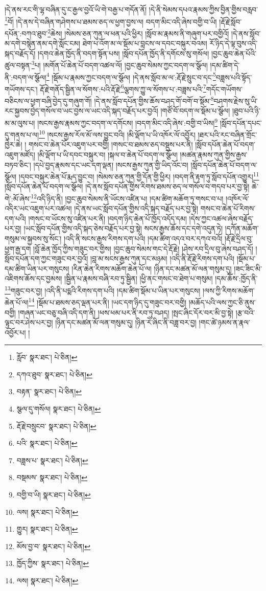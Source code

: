 །དེ་ནས་རང་གི་ལྷ་བཞིན་དུ་ང་རྒྱལ་བྱའོ་ཡི་གེ་བརྒྱ་པ་གདོན་ནོ། །དེ་ནི་སེམས་དཔའ་རྣམས་ཀྱིས་བྱིན་གྱིས་བརླབ་\footnote{རློབ་  སྣར་ཐང་།  པེ་ཅིན། }བོ། །དེ་ནས་དེ་བཞིན་གཤེགས་པ་ཐམས་ཅད་ལ་ཕྱག་བྱས་ལ། བདག་མིང་འདི་ཞེས་བགྱི་བ་ཡི། །རྡོ་རྗེ་སློབ་དཔོན་:བཀའ་ཐུབ་\footnote{དཀའ་ཐུབ་  སྣར་ཐང་།  པེ་ཅིན། }ཆེས། །སེམས་ཅན་ཀུན་ལ་ཕན་པའི་ཕྱིར། །སློབ་མ་རྣམས་ནི་གཞུག་པར་བགྱིའོ། །དེ་ནས་སློབ་མ་དགེ་བསྙེན་ནམ་དགེ་སློང་ངམ། ཐེག་པ་འོག་མ་ལ་སྡོམ་པ་བླངས་ལ་དབང་བསྐུར་བའམ། རོ་ཉིད་དེ་ལྟ་བུས་འདི་སྐད་བརྗོད་དོ། །དགའ་ཆེན་ཁྱོད་ནི་བདག་སྟོན་པས། །སློབ་དཔོན་ཁྱོད་ནི་དགོངས་སུ་གསོལ། །བྱང་ཆུབ་ཆེན་པོའི་ཚུལ་བསྟན་\footnote{བརྟན་  སྣར་ཐང་།  པེ་ཅིན། }པ། །མགོན་པོ་ཆེན་པོ་བདག་འཚལ་ལོ། །བྱང་ཆུབ་སེམས་ཀྱང་བདག་ལ་སྩོལ། །དམ་ཚིག་དེ་ནི་:བདག་ལ་སྩོལ།\footnote{སྩལ་དུ་གསོལ།  སྣར་ཐང་།  པེ་ཅིན། } །སྡོམ་པ་རྣམས་ཀྱང་བདག་ལ་སྩོལ། །དེ་ནས་སློབ་མ་ལ་:རྡོ་རྗེ་སྲུང་བ་དང་\footnote{རྡོ་རྗེ་བསྲུངབ་  སྣར་ཐང་།  པེ་ཅིན། }བཟླས་པའི་སྟོད་གཡོགས་དང་། རྡོ་རྗེ་གནོད་སྦྱིན་ལ་སོགས་:པའི་རྡོ་རྗེ་\footnote{པའི་  སྣར་ཐང་།  པེ་ཅིན། }ལྕགས་ཀྱུ་ལ་སོགས་པ་:བཟླས་པའི་\footnote{བཟླས་པ་  སྣར་ཐང་།  པེ་ཅིན། }གདོང་གཡོགས་བཅིངས་ལ་ཕྱག་བཞི་བྱེད་དུ་གཞུག་གོ། །དེ་ནས་སློབ་དཔོན་གྱིས་ཆོས་བཤད་གོ་བགོ་བ་སྡོམ་\footnote{བསྡམས་  སྣར་ཐང་།  པེ་ཅིན། }བཤགས་རྗེས་སུ་ཡི་རང་སྐྱབས་བྱེད་གསོལ་བ་ཡང་བྱས་ལ་ཡང་འདི་སྐད་བརྗོད་པར་བྱའོ། །གཙོ་བོ་བདག་ལ་སྡོམ་པ་སྩོལ། །ཐུབ་པའི་ཉི་མ་མ་ལུས་པ། །སངས་རྒྱས་རྣམས་ཀྱང་བདག་ལ་དགོངས། །བདག་མིང་འདི་ཞེས་:བགྱི་བ་ཡིས།\footnote{བགྱི་བ་ཡི།  སྣར་ཐང་།  པེ་ཅིན། } །སློབ་དཔོན་དཔང་དུ་གནས་པ་ལ།\footnote{ལས།  སྣར་ཐང་།  པེ་ཅིན། } །སངས་རྒྱས་རོལ་མོ་ལས་བྱུང་བའི། །མི་ལྡོག་པ་ཡི་འཁོར་ལོ་འབྱོར། །ཐར་པའི་རང་བཞིན་གྲོང་ཁྱེར་ཆེ། །
གསང་བ་ཆེན་པོར་འཇུག་པར་བགྱི། །གསང་བ་ཐམས་ཅད་བསྡུས་པར་ནི། །སློབ་དཔོན་ཆེན་པོ་བདག་འཇུག་མཛོད། །མི་ལྡོག་པ་ཡི་དབང་བསྐུར་བ། །སྐལ་བ་ཆེན་པོ་བདག་ལ་སྩོལ། །མཚན་རྣམས་ཀུན་གྱིས་རྒྱས་བཏབ་ཅིང་། །དཔེ་བྱད་རྣམས་དང་ཡང་དག་ལྡན། །སངས་རྒྱས་ཀུན་གྱི་ཡིད་འོང་བ། །སློབ་དཔོན་ཆེན་པོ་བདག་ལ་སྩོལ། །དབང་བསྐུར་ཆེན་པོ་རྨད་བྱུང་བ། །སེམས་ཅན་ཀུན་གྱི་དོན་གྱི་ཕྱིར། །བདག་ནི་རྟག་ཏུ་སློབ་དཔོན་འགྱུར།\footnote{གྱུར།  སྣར་ཐང་།  པེ་ཅིན། } །སློབ་དཔོན་ཆེན་པོ་བདག་ལ་སྩོལ། །དེ་ནས་སློབ་དཔོན་གྱིས་རིགས་ཐམས་ཅད་ལ་གསོལ་བ་གདབ་པར་བྱ་སྟེ། ཆེ་གེ་:མོ་ཞེས་\footnote{མོས་བྱ་བ་  སྣར་ཐང་།  པེ་ཅིན། }འདི་ཉིད་ནི། །བྱང་ཆུབ་སེམས་ནི་ཡོངས་འཛིན་པ། །དམ་ཚིག་མཆོག་ཏུ་གསང་བ་པ། །འཁོར་ལོ་འདིར་ཡང་འཇུག་པར་འཚལ། །དེ་ནས་ཡང་སློབ་དཔོན་གྱིས་འདི་སྐད་བརྗོད་པར་བྱ་སྟེ། གསང་བ་ཆེན་པོ་རིགས་དག་པའི། །གསང་བ་ཡོངས་སུ་འཛིན་པར་ནི། །བདག་ཉིད་ཆེན་པོ་ཁྱོད་འདོད་དམ། །དེས་ཀྱང་འཚལ་ཞེས་བརྗོད་པར་བྱ། །ཡང་སློབ་དཔོན་གྱིས་འདི་སྐད་ཅེས་བརྗོད་པར་བྱ་སྟེ། སངས་རྒྱས་ཆོས་དང་དགེ་འདུན་ཏེ། །དཀོན་མཆོག་གསུམ་ལ་སྐྱབས་སུ་སོང་། །འདི་ནི་སངས་རྒྱས་རིགས་དག་པའི། །དམ་ཚིག་འདའ་བར་དཀའ་བའོ། །རྡོ་རྗེ་དྲིལ་བུ་ཕྱག་རྒྱ་དག །བློ་ཆེན་ཁྱོད་ཀྱིས་གཟུང་བར་གྱིས། །བྱང་ཆུབ་སེམས་གང་དེ་རྡོ་རྗེ། །ཤེས་རབ་དྲིལ་བུ་ཞེས་བཤད་དོ། །སློབ་དཔོན་དག་ཀྱང་གཟུང་བར་བྱའོ། །བླ་མ་སངས་རྒྱས་ཀུན་དང་མཉམ། །འདི་ནི་རྡོ་རྗེ་རིགས་དག་པའི། །སྡོམ་པ་དམ་ཚིག་ཡིན་པར་གསུངས། །རིན་ཆེན་རིགས་མཆོག་ཆེན་པོ་ལ། །ཉིན་དང་མཚན་མོ་ལན་གསུམ་དུ། །ཟང་ཟིང་མི་འཇིགས་ཆོས་དང་བྱམས། །སྦྱིན་པ་རྣམས་བཞི་རབ་ཏུ་སྦྱིན། །ཕྱི་ནང་གསང་བ་ཐེག་པ་གསུམ། །དམ་ཆོས་:ཁྱོད་ནི་\footnote{ཁྱོད་ཀྱིས་  སྣར་ཐང་།  པེ་ཅིན། }གཟུང་བར་བྱ། །འདི་ནི་པདྨའི་རིགས་དག་པའི། །དམ་ཚིག་སྡོམ་པ་ཡིན་པར་གསུངས། །ལས་ཀྱི་རིགས་མཆོག་ཆེན་པོ་ལ།\footnote{ལས།  སྣར་ཐང་།  པེ་ཅིན། } །སྡོམ་པ་ཐམས་ཅད་ལྡན་པར་ནི། །ཡང་དག་ཉིད་དུ་གཟུང་བར་བགྱི། །མཆོད་པའི་ལས་ཀྱང་ཅི་ནུས་བགྱི། །གཞན་ཡང་བཅུ་བཞི་འདི་དག་ནི། །ཕས་ཕམ་པར་ནི་རབ་ཏུ་བཤད། །སྤང་ཞིང་དོར་བར་མི་བྱ་སྟེ། །རྩ་བའི་ལྟུང་བར་ཤེས་པར་བྱ། །ཉིན་དང་མཚན་མོ་ལན་གསུམ་དུ། །ཉིན་རེ་ཞིང་ནི་བཟླ་བར་བྱ། །གང་ཚེ་ཉམས་ན་རྣལ་འབྱོར་པ། །
